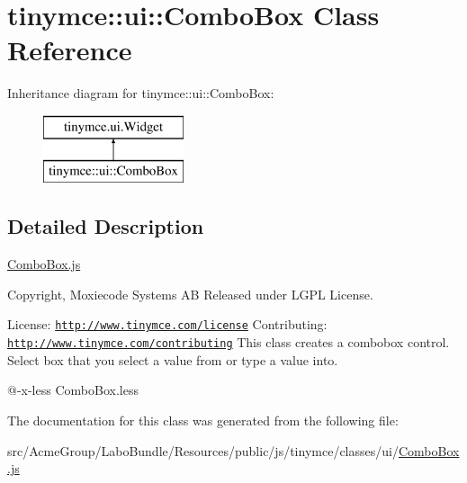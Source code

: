 \hypertarget{classtinymce_1_1ui_1_1_combo_box}{\section{tinymce\+:\+:ui\+:\+:Combo\+Box Class Reference}
\label{classtinymce_1_1ui_1_1_combo_box}
}
Inheritance diagram for tinymce\+:\+:ui\+:\+:Combo\+Box\+:\begin{figure}[H]
\begin{center}
\leavevmode
\includegraphics[height=2.000000cm]{classtinymce_1_1ui_1_1_combo_box}
\end{center}
\end{figure}


\subsection{Detailed Description}
\hyperlink{_combo_box_8js}{Combo\+Box.\+js}

Copyright, Moxiecode Systems A\+B Released under L\+G\+P\+L License.

License\+: \href{http://www.tinymce.com/license}{\tt http\+://www.\+tinymce.\+com/license} Contributing\+: \href{http://www.tinymce.com/contributing}{\tt http\+://www.\+tinymce.\+com/contributing} This class creates a combobox control. Select box that you select a value from or type a value into.

@-\/x-\/less Combo\+Box.\+less 

The documentation for this class was generated from the following file\+:\begin{DoxyCompactItemize}
\item 
src/\+Acme\+Group/\+Labo\+Bundle/\+Resources/public/js/tinymce/classes/ui/\hyperlink{_combo_box_8js}{Combo\+Box.\+js}\end{DoxyCompactItemize}
